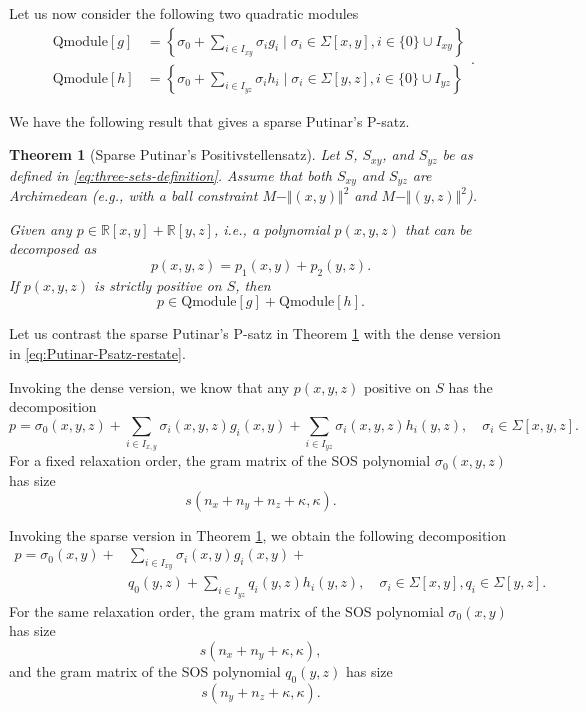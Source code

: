 \documentclass[
]{book}
\newtheorem{theorem}{Theorem}[chapter]
\theoremstyle{definition}
\theoremstyle{definition}
\theoremstyle{definition}
\theoremstyle{definition}
\theoremstyle{remark}
\begin{document}
Let us now consider the following two quadratic modules
\begin{equation}
\begin{split}
\mathrm{Qmodule}[g] &=  \left\{  \sigma_0 + \sum_{i \in I_{xy}} \sigma_i g_i \mid \sigma_i \in \Sigma[x,y], i\in \{ 0 \} \cup I_{xy}  \right\}  \\
\mathrm{Qmodule}[h] &=  \left\{  \sigma_0 + \sum_{i \in I_{yz}} \sigma_i h_i \mid \sigma_i \in \Sigma[y,z], i\in \{ 0 \} \cup I_{yz}  \right\} 
\end{split}.
\label{eq:quadratic-modules-separate-three-sets}
\end{equation}

We have the following result that gives a sparse Putinar's P-satz.

\begin{theorem}[Sparse Putinar's Positivstellensatz]
\protect\hypertarget{thm:SparsePutinarThreeSets}{}\label{thm:SparsePutinarThreeSets}Let \(S\), \(S_{xy}\), and \(S_{yz}\) be as defined in \eqref{eq:three-sets-definition}. Assume that both \(S_{xy}\) and \(S_{yz}\) are Archimedean (e.g., with a ball constraint \(M - \Vert (x,y) \Vert^2\) and \(M - \Vert (y,z) \Vert^2\)).

Given any \(p \in \mathbb{R}[x,y] + \mathbb{R}[y,z]\), i.e., a polynomial \(p(x,y,z)\) that can be decomposed as
\[
p(x,y,z) = p_1(x,y) + p_2(y,z).
\]
If \(p(x,y,z)\) is strictly positive on \(S\), then
\[
p \in \mathrm{Qmodule}[g] + \mathrm{Qmodule}[h].
\]
\end{theorem}

Let us contrast the sparse Putinar's P-satz in Theorem \ref{thm:SparsePutinarThreeSets} with the dense version in \eqref{eq:Putinar-Psatz-restate}.

Invoking the dense version, we know that any \(p(x,y,z)\) positive on \(S\) has the decomposition
\begin{equation}
p = \sigma_0(x,y,z) + \sum_{i \in I_{x,y}} \sigma_i(x,y,z) g_i(x,y) + \sum_{i \in I_{yz}} \sigma_i(x,y,z) h_i(y,z), \quad \sigma_i \in \Sigma[x,y,z].
\label{eq:dense-Putinar-three-sets}
\end{equation}
For a fixed relaxation order, the gram matrix of the SOS polynomial \(\sigma_0(x,y,z)\) has size
\[
s(n_x + n_y + n_z + \kappa, \kappa).
\]

Invoking the sparse version in Theorem \ref{thm:SparsePutinarThreeSets}, we obtain the following decomposition
\begin{equation}
\begin{split}
p = \sigma_0(x,y) + & \sum_{i \in I_{xy}} \sigma_i(x,y) g_i(x,y) + \\ & q_0(y,z) + \sum_{i \in I_{yz}} q_i(y,z) h_i(y,z), \quad \sigma_i \in \Sigma[x,y], q_i \in \Sigma[y,z].
\end{split}
\label{eq:sparse-Putinar-three-sets}
\end{equation}
For the same relaxation order, the gram matrix of the SOS polynomial \(\sigma_0(x,y)\) has size
\[
s(n_x + n_y + \kappa,\kappa),
\]
and the gram matrix of the SOS polynomial \(q_0(y,z)\) has size
\[
s(n_y + n_z + \kappa, \kappa).
\]
\end{document}
